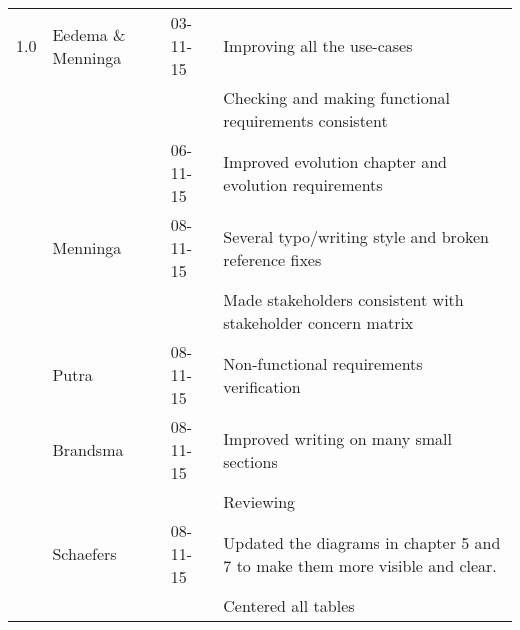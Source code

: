 \begin{longtable}{L{} L{} L{} L{}}
	
	1.0				& Eedema \& Menninga & 03-11-15 & Improving all the use-cases \\
					& 					 & 			& Checking and making functional requirements consistent \\
					&       			 & 06-11-15 & Improved evolution chapter and evolution requirements \\
					& Menninga			 & 08-11-15 & Several typo/writing style and broken reference fixes \\
					& 					 & 			& Made stakeholders consistent with stakeholder concern matrix \\
					& Putra				 & 08-11-15 & Non-functional requirements verification \\
					& Brandsma			 & 08-11-15 & Improved writing on many small sections \\
					& 					 & 			& Reviewing \\ 
					& Schaefers			 & 08-11-15 & Updated the diagrams in chapter 5 and 7 to make them more visible and clear. \\
					& 					 & 			& Centered all tables \\

	\bottomrule
\end{longtable}